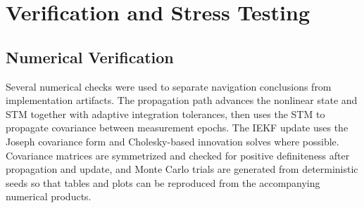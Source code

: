 \documentclass[10pt,twocolumn]{article}
\begin{document}
\begin{table}[t]
\centering
\caption{Measurement-delay sweep, $n=1000$ trials per delay step.  Median miss inflates by an order of magnitude on a single delayed step while the median Moon-center NIS only moves from $1.94$ to $2.04$; the median NEES diverges instead.  $\Delta t$ is in CR3BP non-dimensional time units (one ND time $\approx$ $4.34$ days physical time at the Earth--Moon scale).}
\label{tab:delay}
\scriptsize
{}
\end{table}

\section{Verification and Stress Testing}
\subsection{Numerical Verification}
Several numerical checks were used to separate navigation conclusions from implementation artifacts.  The propagation path advances the nonlinear state and STM together with adaptive integration tolerances, then uses the STM to propagate covariance between measurement epochs.  The IEKF update uses the Joseph covariance form and Cholesky-based innovation solves where possible.  Covariance matrices are symmetrized and checked for positive definiteness after propagation and update, and Monte Carlo trials are generated from deterministic seeds so that tables and plots can be reproduced from the accompanying numerical products.
\end{document}
